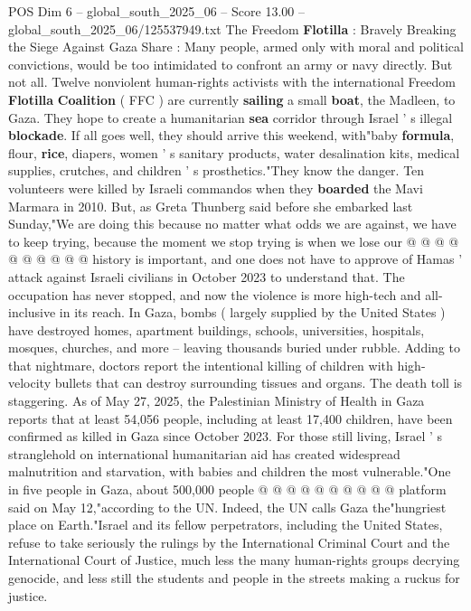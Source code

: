 \begin{textsample}{POS Dim 6 – global\_south\_2025\_06 – Score 13.00 – global\_south\_2025\_06/125537949.txt}  \label{ex:f6_pos_016}
The Freedom \textbf{Flotilla} : Bravely Breaking the Siege Against Gaza Share : Many people, armed only with moral and political convictions, would be too intimidated to confront an army or navy directly.
But not all.
Twelve nonviolent human-rights activists with the international Freedom \textbf{Flotilla} \textbf{Coalition} ( FFC ) are currently \textbf{sailing} a small \textbf{boat}, the Madleen, to Gaza.
They hope to create a humanitarian \textbf{sea} corridor through Israel ' s illegal \textbf{blockade}.
If all goes well, they should arrive this weekend, with"baby \textbf{formula}, flour, \textbf{rice}, diapers, women ' s sanitary products, water desalination kits, medical supplies, crutches, and children ' s prosthetics."They know the danger.
Ten volunteers were killed by Israeli commandos when they \textbf{boarded} the Mavi Marmara in 2010.
But, as Greta Thunberg said before she embarked last Sunday,"We are doing this because no matter what odds we are against, we have to keep trying, because the moment we stop trying is when we lose our @ @ @ @ @ @ @ @ @ @ history is important, and one does not have to approve of Hamas ' attack against Israeli civilians in October 2023 to understand that.
The occupation has never stopped, and now the violence is more high-tech and all-inclusive in its reach.
In Gaza, bombs ( largely supplied by the United States ) have destroyed homes, apartment buildings, schools, universities, hospitals, mosques, churches, and more -- leaving thousands buried under rubble.
Adding to that nightmare, doctors report the intentional killing of children with high-velocity bullets that can destroy surrounding tissues and organs.
The death toll is staggering.
As of May 27, 2025, the Palestinian Ministry of Health in Gaza reports that at least 54,056 people, including at least 17,400 children, have been confirmed as killed in Gaza since October 2023.
For those still living, Israel ' s stranglehold on international humanitarian aid has created widespread malnutrition and starvation, with babies and children the most vulnerable."One in five people in Gaza, about 500,000 people @ @ @ @ @ @ @ @ @ @ platform said on May 12,"according to the UN.
Indeed, the UN calls Gaza the"hungriest place on Earth."Israel and its fellow perpetrators, including the United States, refuse to take seriously the rulings by the International Criminal Court and the International Court of Justice, much less the many human-rights groups decrying genocide, and less still the students and people in the streets making a ruckus for justice.

\end{textsample}
